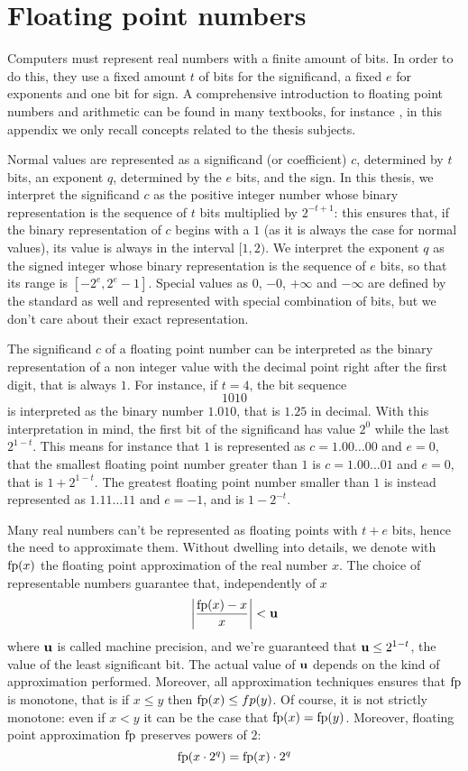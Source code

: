 \chapter{Floating point numbers}\label{appA:fp-numbers}
Computers must represent real numbers with a finite amount of bits. In order to do this, they use a fixed amount $t$ of bits for the significand, a fixed $e$ for exponents and one bit for sign. A comprehensive introduction to floating point numbers and arithmetic can be found in many textbooks, for instance \cite{overton-num-analysis-book}, in this appendix we only recall concepts related to the thesis subjects.

Normal values are represented as a significand (or coefficient) $c$, determined by $t$ bits, an exponent $q$, determined by the $e$ bits, and the sign. In this thesis, we interpret the significand $c$ as the positive integer number whose binary representation is the sequence of $t$ bits multiplied by $2^{-t+1}$: this ensures that, if the binary representation of $c$ begins with a $1$ (as it is always the case for normal values), its value is always in the interval $[1, 2)$. We interpret the exponent $q$ as the signed integer whose binary representation is the sequence of $e$ bits, so that its range is $[-2^e, 2^e - 1]$.
Special values as $0$, $-0$, $+\infty$ and $-\infty$ are defined by the standard as well and represented with special combination of bits, but we don't care about their exact representation.

The significand $c$ of a floating point number can be interpreted as the binary representation of a non integer value with the decimal point right after the first digit, that is always $1$. For instance, if $t = 4$, the bit sequence
\[
1010
\]
is interpreted as the binary number $1.010$, that is $1.25$ in decimal. With this interpretation in mind, the first bit of the significand has value $2^0$ while the last $2^{1-t}$.
This means for instance that $1$ is represented as $c = 1.00 \dots 00$ and $e = 0$, that the smallest floating point number greater than $1$ is $c = 1.00 \dots 01$ and $e = 0$, that is $1 + 2^{1-t}$. The greatest floating point number smaller than $1$ is instead represented as $1.11 \dots 11$ and $e = -1$, and is $1 - 2^{-t}$.

Many real numbers can't be represented as floating points with $t + e$ bits, hence the need to approximate them. Without dwelling into details, we denote with $\text{fp}(x)$ the floating point approximation of the real number $x$. The choice of representable numbers guarantee that, independently of $x$
\[
\left\lvert \frac{\text{fp}(x) - x}{x} \right\rvert < \textbf{u}
\]
where $\textbf{u}$ is called machine precision, and we're guaranteed that $\textbf{u} \le 2^{1-t}$, the value of the least significant bit. The actual value of $\textbf{u}$ depends on the kind of approximation performed. Moreover, all approximation techniques ensures that $\text{fp}$ is monotone, that is if $x \le y$ then $\text{fp}(x) \le fp(y)$. Of course, it is not strictly monotone: even if $x < y$ it can be the case that $\text{fp}(x) = \text{fp}(y)$.
Moreover, floating point approximation $\text{fp}$ preserves powers of $2$:
\[
\text{fp}(x \cdot 2^q) = \text{fp}(x) \cdot 2^q
\]

